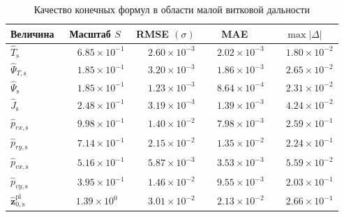 \begin{table}[htbp]
	\centering
	\caption{Качество конечных формул в области малой витковой дальности}
	\label{tab:chap2_short_metrics}
	\begin{tabular}{l c c c c}
		\toprule
		Величина & Масштаб $S$ & RMSE $(\sigma)$ & MAE & $\max |\Delta|$ \\
		\midrule
		$\widehat{T}_{\mathrm{s}}$ &
		$\phantom{-}6.85\times10^{-1}$ &
		$\phantom{-}2.60\times10^{-3}$ &
		$\phantom{-}2.02\times10^{-3}$ &
		$\phantom{-}1.80\times10^{-2}$ \\
		
		$\widehat{\Psi}_{T,\mathrm{s}}$ &
		$\phantom{-}1.85\times10^{-1}$ &
		$\phantom{-}3.20\times10^{-3}$ &
		$\phantom{-}1.86\times10^{-3}$ &
		$\phantom{-}2.65\times10^{-2}$ \\
		
		$\widehat{\Psi}_{\mathrm{s}}$ &
		$\phantom{-}1.85\times10^{-1}$ &
		$\phantom{-}1.23\times10^{-3}$ &
		$\phantom{-}8.64\times10^{-4}$ &
		$\phantom{-}2.31\times10^{-2}$ \\
		
		$\widehat{J}_{\mathrm{s}}$ &
		$\phantom{-}2.48\times10^{-1}$ &
		$\phantom{-}3.19\times10^{-3}$ &
		$\phantom{-}1.39\times10^{-3}$ &
		$\phantom{-}4.24\times10^{-2}$ \\
		
		$\widehat{p}_{rx,\mathrm{s}}$ &
		$\phantom{-}9.98\times10^{-1}$ &
		$\phantom{-}1.40\times10^{-2}$ &
		$\phantom{-}7.98\times10^{-3}$ &
		$\phantom{-}2.59\times10^{-1}$ \\
		
		$\widehat{p}_{ry,\mathrm{s}}$ &
		$\phantom{-}7.14\times10^{-1}$ &
		$\phantom{-}2.15\times10^{-2}$ &
		$\phantom{-}1.35\times10^{-2}$ &
		$\phantom{-}2.24\times10^{-1}$ \\
		
		$\widehat{p}_{vx,\mathrm{s}}$ &
		$\phantom{-}5.16\times10^{-1}$ &
		$\phantom{-}5.87\times10^{-3}$ &
		$\phantom{-}3.53\times10^{-3}$ &
		$\phantom{-}5.59\times10^{-2}$ \\
		
		$\widehat{p}_{vy,\mathrm{s}}$ &
		$\phantom{-}3.95\times10^{-1}$ &
		$\phantom{-}1.46\times10^{-2}$ &
		$\phantom{-}9.55\times10^{-3}$ &
		$\phantom{-}2.03\times10^{-1}$ \\
		
		$\widehat{\mathbf z}^{\mathrm{pl}}_{0,\mathrm{s}}$ &
		$\phantom{-}1.39\times10^{0\phantom{-}}$ &
		$\phantom{-}3.01\times10^{-2}$ &
		$\phantom{-}2.13\times10^{-2}$ &
		$\phantom{-}2.66\times10^{-1}$ \\
		\bottomrule
	\end{tabular}
\end{table}

